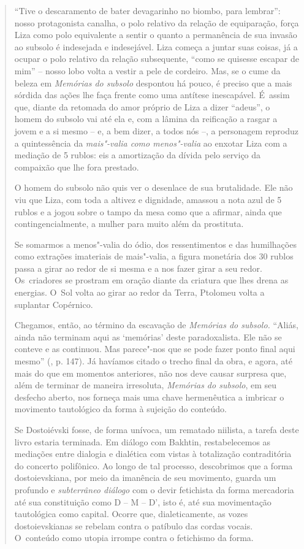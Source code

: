{\begin{quote}
``Tive o descaramento de bater devagarinho no biombo, para lembrar'':
nosso protagonista canalha, o polo relativo da relação de equiparação,
força Liza como polo equivalente a sentir o quanto a permanência de sua
invasão ao subsolo é indesejada e indesejável. Liza começa a juntar suas
coisas, já a ocupar o polo relativo da relação subsequente, ``como se
quisesse escapar de mim'' -- nosso lobo volta a vestir a pele de
cordeiro. Mas, se o cume da beleza em \emph{Memórias do subsolo}
despontou há pouco, é preciso que a mais sórdida das ações lhe faça
frente como uma antítese inescapável. É~assim que, diante da retomada do
amor próprio de Liza a dizer ``adeus'', o homem do subsolo vai até ela
e, com a lâmina da reificação a rasgar a jovem e a si mesmo -- e, a bem
dizer, a todos nós --, a personagem reproduz a quintessência da
\emph{mais"-valia como menos"-valia} ao enxotar Liza com a mediação de 5
rublos: eis a amortização da dívida pelo serviço da compaixão que lhe
fora prestado.

O homem do subsolo não quis ver o desenlace de sua brutalidade. Ele não
viu que Liza, com toda a altivez e dignidade, amassou a nota azul de 5
rublos e a jogou sobre o tampo da mesa como que a afirmar, ainda que
contingencialmente, a mulher para muito além da prostituta.

Se somarmos a menos"-valia do ódio, dos ressentimentos e das humilhações
como extrações imateriais de mais"-valia, a figura monetária dos 30
rublos passa a girar ao redor de si mesma e a nos fazer girar a seu
redor. Os~criadores se prostram em oração diante da criatura que lhes
drena as energias. O~Sol volta ao girar ao redor da Terra, Ptolomeu
volta a suplantar Copérnico.

Chegamos, então, ao término da escavação de \emph{Memórias do subsolo.}
``Aliás, ainda não terminam aqui as `memórias' deste paradoxalista. Ele
não se conteve e as continuou. Mas parece"-nos que se pode fazer ponto
final aqui mesmo'' (, p. 147). Já havíamos citado o trecho final da
obra, e agora, até mais do que em momentos anteriores, não nos deve
causar surpresa que, além de terminar de maneira irresoluta,
\emph{Memórias do subsolo}, em seu desfecho aberto, nos forneça mais uma
chave hermenêutica a imbricar o movimento tautológico da forma à
sujeição do conteúdo.

Se Dostoiévski fosse, de forma unívoca, um rematado niilista, a tarefa
deste livro estaria terminada. Em diálogo com Bakhtin, restabelecemos as
mediações entre dialogia e dialética com vistas à totalização
contraditória do concerto polifônico. Ao longo de tal processo,
descobrimos que a forma dostoievskiana, por meio da imanência de seu
movimento, guarda um profundo e \emph{subterrâneo diálogo} com o devir
fetichista da forma mercadoria até sua constituição como D -- M -- D',
isto é, até sua movimentação tautológica como capital. Ocorre que,
dialeticamente, as vozes dostoievskianas se rebelam contra o patíbulo
das cordas vocais. O~conteúdo como utopia irrompe contra o fetichismo da
forma.


\end{quote}}
